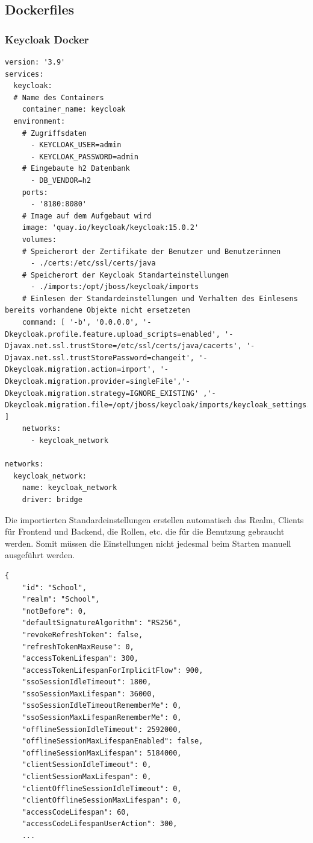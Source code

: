 \subsection{Dockerfiles}
\subsubsection{Keycloak Docker}
\begin{lstlisting}[caption=Keycloak Dockerfile, label=lst:Dockerfile Keycloak]
version: '3.9'
services:
  keycloak:
  # Name des Containers
    container_name: keycloak
  environment:
    # Zugriffsdaten
      - KEYCLOAK_USER=admin
      - KEYCLOAK_PASSWORD=admin
    # Eingebaute h2 Datenbank
      - DB_VENDOR=h2
    ports:
      - '8180:8080'
    # Image auf dem Aufgebaut wird
    image: 'quay.io/keycloak/keycloak:15.0.2'
    volumes:
    # Speicherort der Zertifikate der Benutzer und Benutzerinnen  
      - ./certs:/etc/ssl/certs/java
    # Speicherort der Keycloak Standarteinstellungen
      - ./imports:/opt/jboss/keycloak/imports
    # Einlesen der Standardeinstellungen und Verhalten des Einlesens bereits vorhandene Objekte nicht ersetzeten
    command: [ '-b', '0.0.0.0', '-Dkeycloak.profile.feature.upload_scripts=enabled', '-Djavax.net.ssl.trustStore=/etc/ssl/certs/java/cacerts', '-Djavax.net.ssl.trustStorePassword=changeit', '-Dkeycloak.migration.action=import', '-Dkeycloak.migration.provider=singleFile','-Dkeycloak.migration.strategy=IGNORE_EXISTING' ,'-Dkeycloak.migration.file=/opt/jboss/keycloak/imports/keycloak_settings.json' ]
    networks:
      - keycloak_network

networks:
  keycloak_network:
    name: keycloak_network
    driver: bridge
\end{lstlisting}
Die importierten Standardeinstellungen erstellen automatisch das Realm, Clients für Frontend und Backend, die Rollen, etc. die 
für die Benutzung gebraucht werden. Somit müssen die Einstellungen nicht jedesmal beim Starten manuell ausgeführt werden.
\begin{lstlisting}[caption=Auszug aus den importieren Einstellungen, label=lst:Imortierte Einstellungen]
  {
    "id": "School",
    "realm": "School",
    "notBefore": 0,
    "defaultSignatureAlgorithm": "RS256",
    "revokeRefreshToken": false,
    "refreshTokenMaxReuse": 0,
    "accessTokenLifespan": 300,
    "accessTokenLifespanForImplicitFlow": 900,
    "ssoSessionIdleTimeout": 1800,
    "ssoSessionMaxLifespan": 36000,
    "ssoSessionIdleTimeoutRememberMe": 0,
    "ssoSessionMaxLifespanRememberMe": 0,
    "offlineSessionIdleTimeout": 2592000,
    "offlineSessionMaxLifespanEnabled": false,
    "offlineSessionMaxLifespan": 5184000,
    "clientSessionIdleTimeout": 0,
    "clientSessionMaxLifespan": 0,
    "clientOfflineSessionIdleTimeout": 0,
    "clientOfflineSessionMaxLifespan": 0,
    "accessCodeLifespan": 60,
    "accessCodeLifespanUserAction": 300,
    ...
\end{lstlisting}

